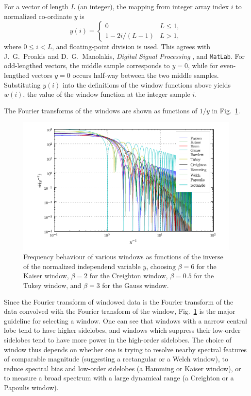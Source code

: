 For a vector of length $L$ (an integer), the mapping from integer array
index $i$ to normalized co-ordinate $y$ is
\begin{equation}
y(i)
   = \left\{ \begin{array}{ll}
   0 & L \le 1, \\
   1 - 2 i / (L - 1) & L > 1,
   \end{array} \right.
\end{equation}
where $0 \le i < L$, and floating-point division is used.  This agrees with
J.~G.~Proakis and D.~G.~Manolakis, \textit{Digital Signal Processing}
\cite{pm}, and \texttt{MatLab}.  For odd-lengthed vectors, the middle
sample corresponds to $y = 0$, while for even-lengthed vectors $y = 0$
occurs half-way between the two middle samples.  Substituting $y(i)$ into
the definitions of the window functions above yields $w(i)$, the value of
the window function at the integer sample $i$.

The Fourier transforms of the windows are shown as functions of $1 / y$ in
Fig.~\ref{f:window-f}.
\begin{figure}
\begin{center}
\includegraphics{window_f}
\end{center}
\caption{\label{f:window-f} Frequency behaviour of various windows as
functions of the inverse of the normalized independend variable $y$,
choosing $\beta = 6$ for the Kaiser window, $\beta = 2$ for the Creighton
window, $\beta = 0.5$ for the Tukey window, and $\beta = 3$ for the Gauss
window.}
\end{figure}
Since the Fourier transform of windowed data is the Fourier transform of
the data convolved with the Fourier transform of the window,
Fig.~\ref{f:window-f} is the major guideline for selecting a window.  One
can see that windows with a narrow central lobe tend to have higher
sidelobes, and windows which suppress their low-order sidelobes tend to
have more power in the high-order sidelobes.  The choice of window thus
depends on whether one is trying to resolve nearby spectral features of
comparable magnitude (suggesting a rectangular or a Welch window), to
reduce spectral bias and low-order sidelobes (a Hamming or Kaiser window),
or to measure a broad spectrum with a large dynamical range (a Creighton or
a Papoulis window).


